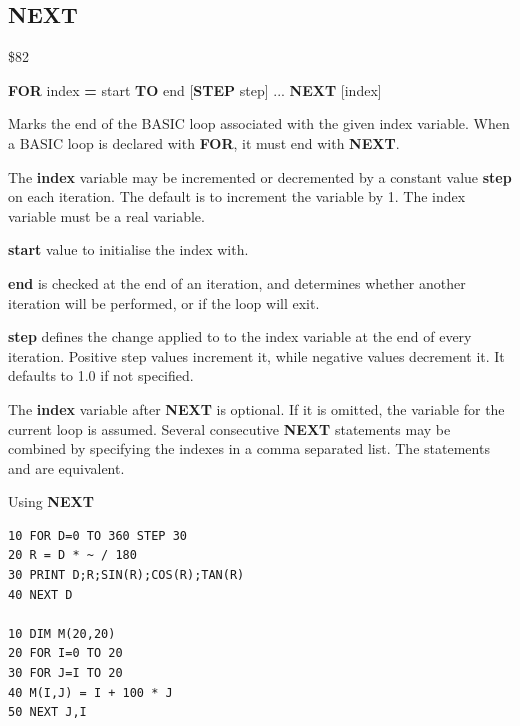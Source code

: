 \subsection{NEXT}
\begin{description}[leftmargin=2cm,style=nextline]
\item [Token:] \$82
\item [Format:] {\bf FOR} index {\bf =} start {\bf TO} end
		[{\bf STEP} step] ... {\bf NEXT} [index]
\item [Usage:] Marks the end of the BASIC loop associated with the given index variable. When
               a BASIC loop is declared with {\bf FOR}, it must end with
               {\bf NEXT}.

               The {\bf index} variable may be incremented or decremented
               by a constant value {\bf step} on each iteration. The default
               is to increment the variable by 1.
               The index variable must be a real variable.

               {\bf start} value to initialise the index with.

               {\bf end} is checked at the end of an iteration,
               and determines whether another iteration will be performed,
               or if the loop will exit.

               {\bf step} defines the change applied to
               to the index variable at the end of every iteration.
               Positive step values increment it, while negative values
               decrement it. It defaults to 1.0 if not specified.

\item [Remarks:] The {\bf index} variable after {\bf NEXT} is
               optional. If it is omitted, the variable
               for the current loop is assumed.
               Several consecutive {\bf NEXT} statements may be
               combined by specifying the indexes in a comma
               separated list. The statements
                and
                are equivalent.

\item [Example:] Using {\bf NEXT}
\begin{tcolorbox}[colback=black,coltext=white]
\verbatimfont{\codefont}
\begin{verbatim}
10 FOR D=0 TO 360 STEP 30
20 R = D * ~ / 180
30 PRINT D;R;SIN(R);COS(R);TAN(R)
40 NEXT D

10 DIM M(20,20)
20 FOR I=0 TO 20
30 FOR J=I TO 20
40 M(I,J) = I + 100 * J
50 NEXT J,I
\end{verbatim}
\end{tcolorbox}
\end{description}

